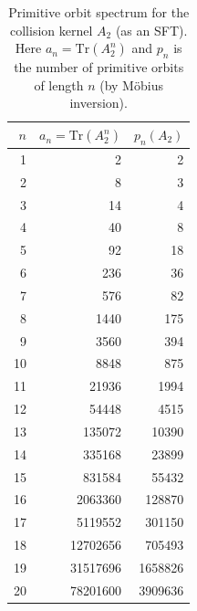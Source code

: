 \begin{table}[H]
\centering
\scriptsize
\setlength{\tabcolsep}{6pt}
\caption{Primitive orbit spectrum for the collision kernel $A_2$ (as an SFT). Here $a_n=\mathrm{Tr}(A_2^n)$ and $p_n$ is the number of primitive orbits of length $n$ (by M\"obius inversion).}
\label{tab:collision_kernel_A2_primitive}
\begin{tabular}{r r r}
\toprule
$n$ & $a_n=\mathrm{Tr}(A_2^n)$ & $p_n(A_2)$\\
\midrule
1 & 2 & 2\\
2 & 8 & 3\\
3 & 14 & 4\\
4 & 40 & 8\\
5 & 92 & 18\\
6 & 236 & 36\\
7 & 576 & 82\\
8 & 1440 & 175\\
9 & 3560 & 394\\
10 & 8848 & 875\\
11 & 21936 & 1994\\
12 & 54448 & 4515\\
13 & 135072 & 10390\\
14 & 335168 & 23899\\
15 & 831584 & 55432\\
16 & 2063360 & 128870\\
17 & 5119552 & 301150\\
18 & 12702656 & 705493\\
19 & 31517696 & 1658826\\
20 & 78201600 & 3909636\\
\bottomrule
\end{tabular}
\end{table}
